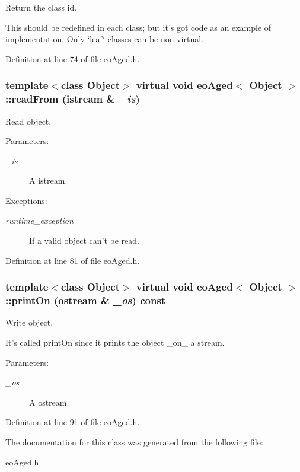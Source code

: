 Return the class id. 

This should be redefined in each class; but it's got code as an example of implementation. Only \char`\"{}leaf\char`\"{} classes can be non-virtual. 

Definition at line 74 of file eo\-Aged.h.
\subsubsection{\setlength{\rightskip}{0pt plus 5cm}template$<$class Object$>$ virtual void {\bf eo\-Aged}$<$ Object $>$::read\-From (istream \& {\em \_\-is})\hspace{0.3cm}{\tt  [inline, virtual]}}\label{classeo_aged_z9_1}


Read object. 

\begin{Desc}
\item[Parameters:]
\begin{description}
\item[{\em \_\-is}]A istream. \end{description}
\end{Desc}
\begin{Desc}
\item[Exceptions:]
\begin{description}
\item[{\em runtime\_\-exception}]If a valid object can't be read. \end{description}
\end{Desc}


Definition at line 81 of file eo\-Aged.h.
\subsubsection{\setlength{\rightskip}{0pt plus 5cm}template$<$class Object$>$ virtual void {\bf eo\-Aged}$<$ Object $>$::print\-On (ostream \& {\em \_\-os}) const\hspace{0.3cm}{\tt  [inline, virtual]}}\label{classeo_aged_z9_2}


Write object. 

It's called print\-On since it prints the object \_\-on\_\- a stream. \begin{Desc}
\item[Parameters:]
\begin{description}
\item[{\em \_\-os}]A ostream. \end{description}
\end{Desc}


Definition at line 91 of file eo\-Aged.h.

The documentation for this class was generated from the following file:\begin{CompactItemize}
\item 
eo\-Aged.h\end{CompactItemize}
